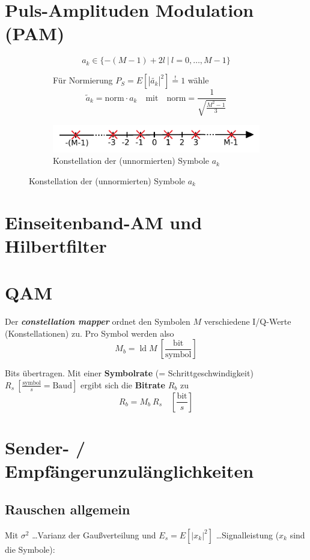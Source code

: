 \documentclass[a4paper, 11pt]{article}
\DeclareMathOperator{\ld}{ld}
\begin{document}
\section*{Puls-Amplituden Modulation (PAM)}
\begin{figure}[H]
	\begin{subfigure}{0.54\textwidth}
		\[
			a_{k} \in \{-(M - 1) + 2l ~ | ~ l = 0, \ldots, M-1\}
		\]

		Für Normierung $P_S = E \left[|\tilde{a_k}|^2 \right] \overset{!}{=} 1$ wähle
		\[
			\tilde a_k = \mathrm{norm} \cdot a_k \quad \text{mit} \quad \mathrm{norm} = \frac{1}{\sqrt{\frac{M^2 - 1}{3}}}
		\]
	\end{subfigure}
	\begin{subfigure}{0.45\textwidth}
		\includegraphics[width=\textwidth]{img/pamconstellation.pdf}
		\caption*{Konstellation der (unnormierten) Symbole $a_k$}
	\end{subfigure}
\end{figure}


\section*{Einseitenband-AM und Hilbertfilter}
\section*{QAM}
Der \textit{\textbf{constellation mapper}} ordnet den Symbolen $M$ verschiedene I/Q-Werte (Konstellationen) zu. Pro Symbol werden also
\[
	M_b = \ld M ~ \left[ \frac{\mathrm{bit}}{\mathrm{symbol}} \right]
\]

Bits übertragen. Mit einer \textbf{Symbolrate} (= Schrittgeschwindigkeit) $R_s ~ \left[\frac{\mathrm{symbol}}{s} = \mathrm{Baud}\right]$ ergibt sich die \textbf{Bitrate} $R_b$ zu
\[
	R_b = M_b ~ R_s \quad \left[ \frac{\mathrm{bit}}{s} \right]
\]

\section*{Sender- / Empfängerunzulänglichkeiten}
\subsection*{Rauschen allgemein}
Mit $\sigma^2$ \ldots Varianz der Gaußverteilung und $E_s = E[|x_k|^2]$ \ldots Signalleistung ($x_k$ sind die Symbole):
\end{document}
